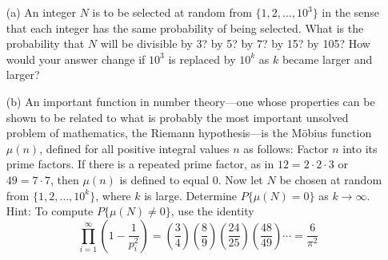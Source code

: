 \begin{exercise}
\begin{enumerate}
    \item[(a)] An integer \(N\) is to be selected at random from \(\{1, 2, \ldots, 10^3\}\) in the sense that each integer has the same probability of being selected. What is the probability that \(N\) will be divisible by 3? by 5? by 7? by 15? by 105? How would your answer change if \(10^3\) is replaced by \(10^k\) as \(k\) became larger and larger?
    \item[(b)] An important function in number theory—one whose properties can be shown to be related to what is probably the most important unsolved problem of mathematics, the Riemann hypothesis—is the Möbius function \(\mu(n)\), defined for all positive integral values \(n\) as follows: Factor \(n\) into its prime factors. If there is a repeated prime factor, as in \(12 = 2 \cdot 2 \cdot 3\) or \(49 = 7 \cdot 7\), then \(\mu(n)\) is defined to equal 0. Now let \(N\) be chosen at random from \(\{1, 2, \ldots, 10^k\}\), where \(k\) is large. Determine \(P\{\mu(N) = 0\}\) as \(k \to \infty\). Hint: To compute \(P\{\mu(N) \neq 0\}\), use the identity
    \[
    \prod_{i=1}^{\infty} \left(1 - \frac{1}{p_i^2}\right) = \left(\frac{3}{4}\right) \left(\frac{8}{9}\right) \left(\frac{24}{25}\right) \left(\frac{48}{49}\right) \cdots = \frac{6}{\pi^2}
    \]
\end{enumerate}
\end{exercise}
